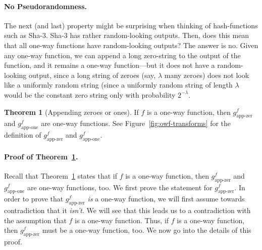 \documentclass[a4paper,table,dvipsnames]{article}
\theoremstyle{definition}
\newtheorem{theorem}{Theorem}
\begin{document}
\paragraph{No Pseudorandomness.} 
The next (and last) property might be surprising when thinking of hash-functions such as Sha-3. Sha-3 has rather random-looking outputs. Then, does this mean that all one-way functions have random-looking outputs? The answer is no. Given any one-way function, we can append a long zero-string to the output of the function, and it remains a one-way function---but it does not have a random-looking output, since a long string of zeroes (say, $\lambda$ many zeroes) does not look like a uniformly random string (since a uniformly random string of length $\lambda$ would be the constant zero string only with probability $2^{-\lambda}$.


\begin{theorem}[Appending zeroes or ones]\label{thm:owf-app-zer}
If $f$ is a one-way function, then $g^f_{\text{app-zer}}$ and $g^f_{\text{app-one}}$ are one-way functions. See Figure~\ref{fig:owf-transforms} for the definition of $g^f_{\text{app-zer}}$ and $g^f_{\text{app-one}}$.
\end{theorem}


\paragraph{Proof of Theorem~\ref{thm:owf-app-zer}.}
Recall that Theorem~\ref{thm:owf-app-zer} states that if $f$ is a one-way function, then $g^f_{\text{app-zer}}$ and $g^f_{\text{app-one}}$ are one-way functions, too. We first prove the statement for $g^f_{\text{app-zer}}$.
In order to prove that $g^f_{\text{app-zer}}$ \emph{is} a one-way function, we will first assume towards contradiction that it \emph{isn't}. We will see that this leads us to a contradiction with the assumption that $f$ is a one-way function. Thus, if $f$ is a one-way function, then
$g^f_{\text{app-zer}}$ must be a one-way function, too. We now go into the details of this proof.
\end{document}
